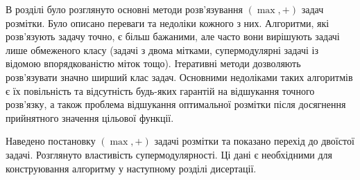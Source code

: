 \chapterConclusion

В розділі було розглянуто основні методи розв’язування $(\max ,+)$ задач розмітки.
Було описано переваги та недоліки кожного з них. Алгоритми, які розв'язують
задачу точно, є більш бажаними, але часто вони вирішують задачі лише обмеженого
класу (задачі з двома мітками, супермодулярні задачі із відомою впорядкованістю
міток тощо). Ітеративні методи дозволяють розв'язувати значно ширший клас задач.
Основними недоліками таких алгоритмів є їх повільність та відсутність будь-яких
гарантій на відшукання точного розв'язку, а також проблема відшукання оптимальної
розмітки після досягнення прийнятного значення цільової функції.

Наведено постановку $(\max,+)$ задачі розмітки та показано перехід до двоїстої задачі.
Розглянуто властивість супермодулярності.
Ці дані є необхідними для конструювання алгоритму у наступному розділі дисертації.
